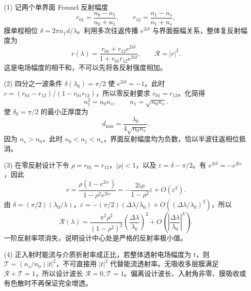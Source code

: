 (1) 记两个单界面 Fresnel 反射幅度
\[
r_{01}=\frac{n_0-n_1}{n_0+n_1},\qquad r_{12}=\frac{n_1-n_s}{n_1+n_s},
\]
膜单程相位 \(\delta=2\pi n_1d/\lambda\)。利用多次往返传播 \(e^{2i\delta}\) 与界面振幅关系，整体复反射幅度为
\[
r(\lambda)=\frac{r_{01}+r_{12}e^{2i\delta}}{1+r_{01}r_{12}e^{2i\delta}},
\qquad \mathcal R=|r|^2.
\]
这是电场幅度的相干和，不可以先将各反射强度相加。

(2) 四分之一波条件 \(\delta(\lambda_0)=\pi/2\) 使 \(e^{2i\delta}=-1\)。此时 \(r=(r_{01}-r_{12})/(1-r_{01}r_{12})\)，所以零反射要求 \(r_{01}=r_{12}\)。化简得
\[
n_1^2=n_0n_s,\qquad n_1=\sqrt{n_0n_s}.
\]
使 \(\delta_0=\pi/2\) 的最小正厚度为
\[
d_{\min}=\frac{\lambda_0}{4\sqrt{n_0n_s}}.
\]
因为 \(n_s>n_0\)，此时 \(n_0<n_1<n_s\)，界面反射幅度均为负数，恰以半波往返相位抵消。

(3) 在零反射设计下令 \(\rho=r_{01}=r_{12}\)，\(|\rho|<1\)，以及 \(\varepsilon=\delta-\pi/2\)。有 \(e^{2i\delta}=-e^{2i\varepsilon}\)，因此
\[
r=\frac{\rho(1-e^{2i\varepsilon})}{1-\rho^2e^{2i\varepsilon}}
=-\frac{2i\rho}{1-\rho^2}\varepsilon+O(\varepsilon^2).
\]
由 \(\delta=(\pi/2)(\lambda_0/\lambda)\)，\(\varepsilon=-(\pi/2)(\Delta\lambda/\lambda_0)+O((\Delta\lambda/\lambda_0)^2)\)，所以
\[
\mathcal R(\lambda)
=\frac{\pi^2\rho^2}{(1-\rho^2)^2}
\left(\frac{\Delta\lambda}{\lambda_0}\right)^2
+O\!\left(\left|\frac{\Delta\lambda}{\lambda_0}\right|^3\right).
\]
一阶反射率项消失，说明设计中心处是严格的反射率极小值。

(4) 正入射时能流与介质折射率成正比，若整体透射电场幅度为 \(t\)，则 \(\mathcal T=(n_s/n_0)|t|^2\)，不可直接用 \(|t|^2\) 代替能流透射率。无吸收多层膜满足 \(\mathcal R+\mathcal T=1\)，所以设计波长 \(\mathcal R=0,\mathcal T=1\)。偏离设计波长、入射角非零、膜吸收或有色散时不再保证完全增透。
